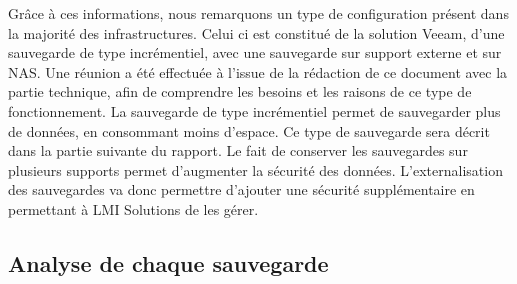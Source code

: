 \documentclass[pfe]{tnreport} %
\begin{document}
Grâce à ces informations, nous remarquons un type de configuration présent dans la majorité des infrastructures. \newline
Celui ci est constitué de la solution Veeam, d'une sauvegarde de type incrémentiel, avec une sauvegarde sur support externe et sur NAS. \newline
Une réunion a été effectuée à l'issue de la rédaction de ce document avec la partie technique, afin de comprendre les besoins et les raisons de ce type de fonctionnement. \newline
La sauvegarde de type incrémentiel permet de sauvegarder plus de données, en consommant moins d'espace. Ce type de sauvegarde sera décrit dans la partie suivante du rapport. \newline
Le fait de conserver les sauvegardes sur plusieurs supports permet d'augmenter la sécurité des données. \newline 
L'externalisation des sauvegardes va donc permettre d'ajouter une sécurité supplémentaire en permettant à LMI Solutions de les gérer.

\subsection{Analyse de chaque sauvegarde}
\end{document}
